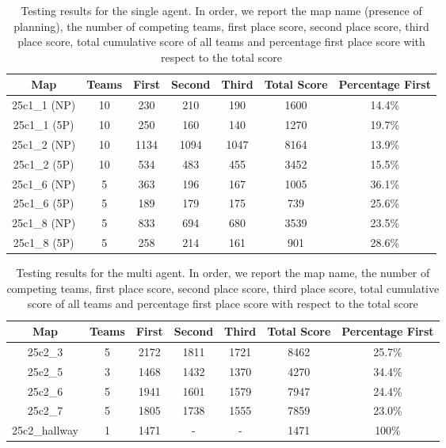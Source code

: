 \begin{table}[h!]
    \centering
    \begin{tabular}{|c|c|c|c|c|c|c|}
        \hline
        Map & Teams & First & Second & Third & Total Score & Percentage First \\
        \hline
        25c1\_1 (NP)  & 10   & 230   & 210   & 190  & 1600  & 14.4\%  \\
        25c1\_1 (5P)  & 10   & 250   & 160   & 140  & 1270  & 19.7\% \\
        25c1\_2 (NP)  & 10  & 1134  & 1094  & 1047  & 8164  & 13.9\% \\
        25c1\_2 (5P)  & 10   & 534   & 483   & 455  & 3452  & 15.5\% \\
        25c1\_6 (NP)   & 5   & 363   & 196   & 167  & 1005  & 36.1\% \\
        25c1\_6 (5P)   & 5   & 189   & 179   & 175   & 739  & 25.6\% \\
        25c1\_8 (NP)   & 5   & 833   & 694   & 680  & 3539  & 23.5\% \\
        25c1\_8 (5P)   & 5   & 258   & 214   & 161   & 901  & 28.6\% \\
        \hline
    \end{tabular}
    \caption{Testing results for the single agent. In order, we report the map name (presence of planning), the number of competing teams, first place score, second place score, third place score, total cumulative score of all teams and percentage first place score with respect to the total score}
    \label{tab:table_1}
\end{table}

\begin{table}[h!]
    \centering
    \begin{tabular}{|c|c|c|c|c|c|c|}
        \hline
        Map & Teams & First & Second & Third & Total Score & Percentage First \\
        \hline
        25c2\_3         & 5  & 2172   & 1811  & 1721  & 8462  & 25.7\% \\
        25c2\_5         & 3  & 1468   & 1432  & 1370  & 4270  & 34.4\% \\
        25c2\_6         & 5  & 1941   & 1601  & 1579  & 7947  & 24.4\% \\
        25c2\_7         & 5  & 1805   & 1738  & 1555  & 7859  & 23.0\% \\
        25c2\_hallway   & 1  & 1471   & -     & -     & 1471  & 100\% \\
        \hline
    \end{tabular}
    \caption{Testing results for the multi agent. In order, we report the map name, the number of competing teams, first place score, second place score, third place score, total cumulative score of all teams and percentage first place score with respect to the total score}
    \label{tab:table_2}
\end{table}